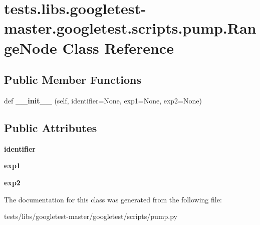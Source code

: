 \hypertarget{classtests_1_1libs_1_1googletest-master_1_1googletest_1_1scripts_1_1pump_1_1RangeNode}{}\section{tests.\+libs.\+googletest-\/master.googletest.\+scripts.\+pump.\+Range\+Node Class Reference}
\label{classtests_1_1libs_1_1googletest-master_1_1googletest_1_1scripts_1_1pump_1_1RangeNode}
\subsection*{Public Member Functions}
\begin{DoxyCompactItemize}
\item 
\mbox{\label{classtests_1_1libs_1_1googletest-master_1_1googletest_1_1scripts_1_1pump_1_1RangeNode_a41ca6a3b4f8966b68efe0bdaa3a64cbe}} 
def {\bfseries \+\_\+\+\_\+init\+\_\+\+\_\+} (self, identifier=None, exp1=None, exp2=None)
\end{DoxyCompactItemize}
\subsection*{Public Attributes}
\begin{DoxyCompactItemize}
\item 
\mbox{\label{classtests_1_1libs_1_1googletest-master_1_1googletest_1_1scripts_1_1pump_1_1RangeNode_af3e68b2df0ecbb773c8bf8d36de2f3fd}} 
{\bfseries identifier}
\item 
\mbox{\label{classtests_1_1libs_1_1googletest-master_1_1googletest_1_1scripts_1_1pump_1_1RangeNode_ada1b5f41227c70c837b58e6e11218a24}} 
{\bfseries exp1}
\item 
\mbox{\label{classtests_1_1libs_1_1googletest-master_1_1googletest_1_1scripts_1_1pump_1_1RangeNode_a6a6be2f8667838d31f1efd70db579ee6}} 
{\bfseries exp2}
\end{DoxyCompactItemize}


The documentation for this class was generated from the following file\+:\begin{DoxyCompactItemize}
\item 
tests/libs/googletest-\/master/googletest/scripts/pump.\+py\end{DoxyCompactItemize}
